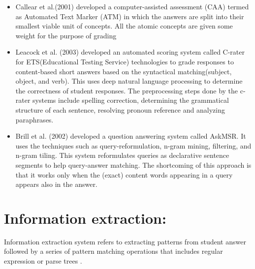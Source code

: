 \documentclass[rnd]{mas_proposal}
\begin{document}
	\begin{itemize}
	 \item Callear et al.(2001) \cite{Callear2001}	developed a  computer-assisted assessment (CAA) termed as Automated Text Marker (ATM) in which the answers are  split  into  their  smallest  viable  unit  of concepts. All the atomic concepts are given some weight for the purpose of grading

	\item Leacock et al. (2003)\cite{Leacock2003} developed an automated scoring system called C-rater for ETS(Educational Testing Service) technologies to grade responses to content-based short answers based on the syntactical matching(subject, object, and verb). This uses deep natural language processing to determine the correctness of student responses. The preprocessing steps done by the c-rater systems include spelling correction, determining the grammatical structure of each sentence, resolving pronoun reference and analyzing paraphrases.
	
	  \item Brill et al. (2002) \cite{Brill2002} developed a question answering system called AskMSR. It uses the techniques such as query-reformulation, n-gram mining, filtering, and n-gram tiling. This system reformulates queries as declarative sentence segments to help query-answer matching. The shortcoming of this approach is that it works only when the (exact) content words appearing in a query appears also in the answer.
	
\end{itemize}


\section{Information extraction:}

	Information extraction system refers to 
extracting patterns from student answer followed by a series of pattern matching operations that includes regular expression or parse trees \cite{Burrows2015}.
\end{document}
